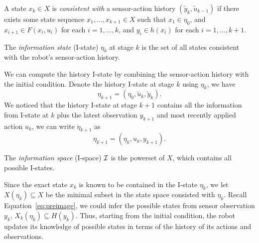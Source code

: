 \begin{defn} 
  A state $x_k \in X$ is \emph{consistent with} a sensor-action history
  $(\tilde{y}_k, \tilde{u}_{k-1})$ if there exists some state sequence
  $x_1,\ldots,x_{k+1} \in X$ such that $x_1 \in \eta_0$, and $x_{i+1} \in F(x_i,
  u_i)$ for each $i=1,\ldots,k$, and $y_i \in h(x_i)$ for each $i=1,\ldots,k+1$.
\end{defn}


\begin{defn}
  \label{def:istate} 
  The \emph{information state} (I-state) $\eta_k$ at stage $k$ is the set of all
  states consistent with the robot's sensor-action history.
\end{defn}


We can compute the history
I-state by combining the sensor-action history with the initial condition.
%
Denote the history I-state at stage $k$ using $\eta_k$, we have
\begin{equation}
  \label{eq:hist-istate}
  \eta_{k+1} = (\eta_0,\tilde{u}_{k},\tilde{y}_{k}).
\end{equation}
%
We noticed that the history I-state at stage $k+1$ contains all the information from
I-state at $k$ plus the latest observation $y_{k+1}$ and most recently applied
action $u_{k}$, we can write $\eta_{k+1}$ as
\begin{equation}
  \label{eq:hist-istate2}
  \eta_{k+1} = (\eta_{k}, {u}_{k}, y_{k+1}).
\end{equation}

\begin{defn}
  \label{def:ispace} 
  The \emph{information space} (I-space) $\mathcal{I}$ is the
  powerset of $X$, which contains all possible I-states.
\end{defn}


Since the exact state $x_k$ is known to be contained in the I-state $\eta_k$, we
let $X(\eta_k) \subseteq X$ be the minimal subset in the state space consisted
with $\eta_k$. 
%
Recall Equation~\ref{eq:preimage}, we could infer the possible states from sensor observation $y_k$, $X_k(\eta_k) \subseteq H(y_k)$. 
%
Thus, starting from the initial condition, the robot updates its knowledge of 
possible states in terms of the history of its actions and observations. 


